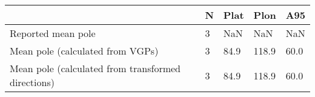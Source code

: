 \begin{tabular}{lllll}
\toprule
{} &  N &  Plat &   Plon &   A95 \\
\midrule
Reported mean pole                                 &  3 &   NaN &    NaN &   NaN \\
Mean pole (calculated from VGPs)                   &  3 &  84.9 &  118.9 &  60.0 \\
Mean pole (calculated from transformed directions) &  3 &  84.9 &  118.9 &  60.0 \\
\bottomrule
\end{tabular}
